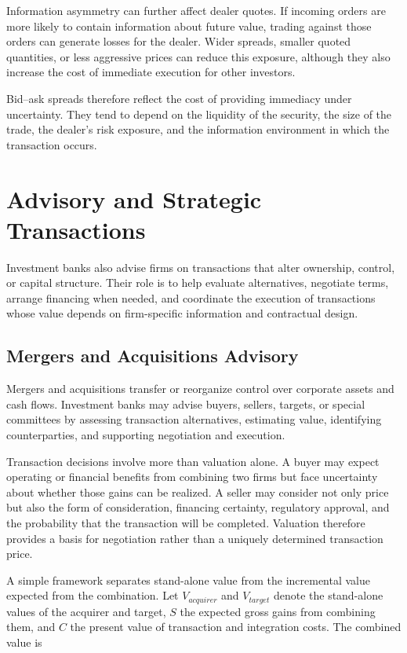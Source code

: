 Information asymmetry can further affect dealer quotes. If incoming orders are more likely to contain information about future value, trading against those orders can generate losses for the dealer. Wider spreads, smaller quoted quantities, or less aggressive prices can reduce this exposure, although they also increase the cost of immediate execution for other investors.

Bid--ask spreads therefore reflect the cost of providing immediacy under uncertainty. They tend to depend on the liquidity of the security, the size of the trade, the dealer's risk exposure, and the information environment in which the transaction occurs.

\section{Advisory and Strategic Transactions}

Investment banks also advise firms on transactions that alter ownership, control, or capital structure. Their role is to help evaluate alternatives, negotiate terms, arrange financing when needed, and coordinate the execution of transactions whose value depends on firm-specific information and contractual design.

\subsection{Mergers and Acquisitions Advisory}

Mergers and acquisitions transfer or reorganize control over corporate assets and cash flows. Investment banks may advise buyers, sellers, targets, or special committees by assessing transaction alternatives, estimating value, identifying counterparties, and supporting negotiation and execution.

Transaction decisions involve more than valuation alone. A buyer may expect operating or financial benefits from combining two firms but face uncertainty about whether those gains can be realized. A seller may consider not only price but also the form of consideration, financing certainty, regulatory approval, and the probability that the transaction will be completed. Valuation therefore provides a basis for negotiation rather than a uniquely determined transaction price.

A simple framework separates stand-alone value from the incremental value expected from the combination. Let $V_{acquirer}$ and $V_{target}$ denote the stand-alone values of the acquirer and target, $S$ the expected gross gains from combining them, and $C$ the present value of transaction and integration costs. The combined value is

